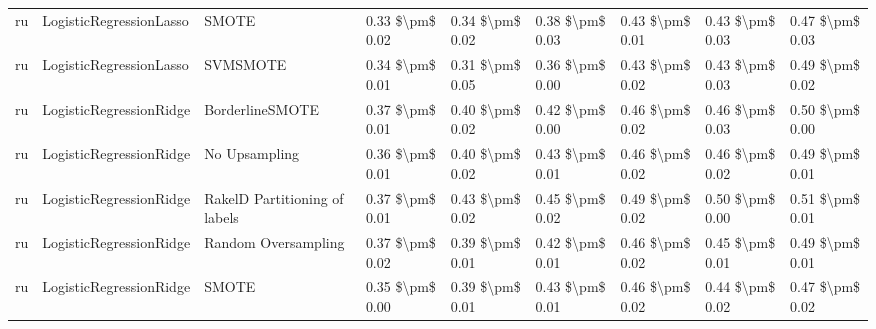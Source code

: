 \begin{tabular}{lllllllll}
      ru &         LogisticRegressionLasso &                         SMOTE & 0.33 \$\textbackslash pm\$ 0.02 &           0.34 \$\textbackslash pm\$ 0.02 &       0.38 \$\textbackslash pm\$ 0.03 &        0.43 \$\textbackslash pm\$ 0.01 &                         0.43 \$\textbackslash pm\$ 0.03 &     0.47 \$\textbackslash pm\$ 0.03 \\
      ru &         LogisticRegressionLasso &                      SVMSMOTE & 0.34 \$\textbackslash pm\$ 0.01 &           0.31 \$\textbackslash pm\$ 0.05 &       0.36 \$\textbackslash pm\$ 0.00 &        0.43 \$\textbackslash pm\$ 0.02 &                         0.43 \$\textbackslash pm\$ 0.03 &     0.49 \$\textbackslash pm\$ 0.02 \\
      ru &         LogisticRegressionRidge &               BorderlineSMOTE & 0.37 \$\textbackslash pm\$ 0.01 &           0.40 \$\textbackslash pm\$ 0.02 &       0.42 \$\textbackslash pm\$ 0.00 &        0.46 \$\textbackslash pm\$ 0.02 &                         0.46 \$\textbackslash pm\$ 0.03 &     0.50 \$\textbackslash pm\$ 0.00 \\
      ru &         LogisticRegressionRidge &                 No Upsampling & 0.36 \$\textbackslash pm\$ 0.01 &           0.40 \$\textbackslash pm\$ 0.02 &       0.43 \$\textbackslash pm\$ 0.01 &        0.46 \$\textbackslash pm\$ 0.02 &                         0.46 \$\textbackslash pm\$ 0.02 &     0.49 \$\textbackslash pm\$ 0.01 \\
      ru &         LogisticRegressionRidge & RakelD Partitioning of labels & 0.37 \$\textbackslash pm\$ 0.01 &           0.43 \$\textbackslash pm\$ 0.02 &       0.45 \$\textbackslash pm\$ 0.02 &        0.49 \$\textbackslash pm\$ 0.02 &                         0.50 \$\textbackslash pm\$ 0.00 &     0.51 \$\textbackslash pm\$ 0.01 \\
      ru &         LogisticRegressionRidge &           Random Oversampling & 0.37 \$\textbackslash pm\$ 0.02 &           0.39 \$\textbackslash pm\$ 0.01 &       0.42 \$\textbackslash pm\$ 0.01 &        0.46 \$\textbackslash pm\$ 0.02 &                         0.45 \$\textbackslash pm\$ 0.01 &     0.49 \$\textbackslash pm\$ 0.01 \\
      ru &         LogisticRegressionRidge &                         SMOTE & 0.35 \$\textbackslash pm\$ 0.00 &           0.39 \$\textbackslash pm\$ 0.01 &       0.43 \$\textbackslash pm\$ 0.01 &        0.46 \$\textbackslash pm\$ 0.02 &                         0.44 \$\textbackslash pm\$ 0.02 &     0.47 \$\textbackslash pm\$ 0.02 \\

\end{tabular}
